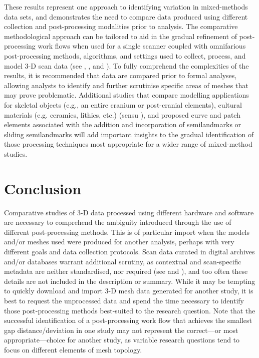\documentclass[review]{elsarticle}
\begin{document}
These results represent one approach to identifying variation in mixed-methods data sets, and demonstrates the need to compare data produced using different collection and post-processing modalities prior to analysis. The comparative methodological approach can be tailored to aid in the gradual refinement of post-processing work flows when used for a single scanner coupled with omnifarious post-processing methods, algorithms, and settings used to collect, process, and model 3-D scan data (see \citealp[22-23 and Figure 2]{RN11473}, \citealp{RN8025}, and \citealp[Figure 4]{sj2021}). To fully comprehend the complexities of the results, it is recommended that data are compared prior to formal analyses, allowing analysts to identify and further scrutinise specific areas of meshes that may prove problematic. Additional studies that compare modelling applications for skeletal objects (e.g., an entire cranium or post-cranial elements), cultural materials (e.g. ceramics, lithics, etc.) (sensu \citealp{RN8074,RN7927,RN8158,RN8370,RN8322,RN8312}), and proposed curve and patch elements associated with the addition and incorporation of semilandmarks or sliding semilandmarks will add important insights to the gradual identification of those processing techniques most appropriate for a wider range of mixed-method studies.

\section{Conclusion}

Comparative studies of 3-D data processed using different hardware and software are necessary to comprehend the ambiguity introduced through the use of different post-processing methods. This is of particular import when the models and/or meshes used were produced for another analysis, perhaps with very different goals and data collection protocols. Scan data curated in digital archives and/or databases warrant additional scrutiny, as contextual and scan-specific metadata are neither standardised, nor required (see \citealt{RN5932} and \citealt{RN11507}), and too often these details are not included in the description or summary. While it may be tempting to quickly download and import 3-D mesh data generated for another study, it is best to request the unprocessed data and spend the time necessary to identify those post-processing methods best-suited to the research question. Note that the successful identification of a post-processing work flow that achieves the smallest gap distance/deviation in one study may not represent the correct---or most appropriate---choice for another study, as variable research questions tend to focus on different elements of mesh topology. 
\end{document}

